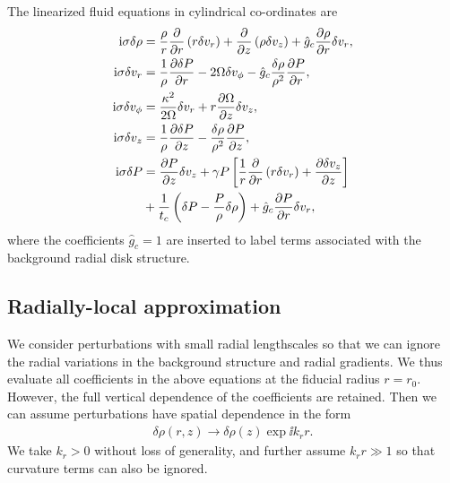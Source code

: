 The linearized fluid equations in cylindrical co-ordinates are  
\begin{align}
  \mathrm{i}\sigma\delta\rho &= \frac{\rho}{r}\frac{\partial}{\partial r}\left(r\delta v_r\right) + \frac{\partial}{\partial
    z}\left(\rho\delta v_z\right)  + \hat{g}_c\frac{\partial\rho}{\partial r}\delta v_r,\\
  \mathrm{i}\sigma\delta v_r &= \frac{1}{\rho}\frac{\partial\delta P}{\partial r} - 2\Omega
  \delta v_\phi - \hat{g}_c\frac{\delta\rho}{\rho^2}\frac{\partial P}{\partial r},\\ 
  \mathrm{i}\sigma\delta v_\phi  &= \frac{\kappa^2}{2\Omega}\delta v_r +
  r\frac{\partial\Omega}{\partial z}\delta v_z,\\
  \mathrm{i} \sigma\delta v_z &= \frac{1}{\rho}\frac{\partial\delta P}{\partial z} -
  \frac{\delta \rho}{\rho^2}\frac{\partial P}{\partial z},\\
  \mathrm{i}\sigma\delta P &=\frac{\partial P}{\partial z}\delta v_z + \gamma P
  \left[\frac{1}{r}\frac{\partial}{\partial r}\left(r\delta v_r\right) + \frac{\partial
      \delta v_z}{\partial z}\right]\notag \\
  &+ \frac{1}{t_c}\left(\delta P -  
    \frac{P}{\rho}\delta\rho\right) + \hat{g}_c \frac{\partial P}{\partial r}\delta v_r,\label{full_energy1}
\end{align}
where the coefficients $\hat{g}_c=1$ are inserted to label terms
associated with the background radial disk structure. 

\subsection{Radially-local approximation}  
We consider perturbations with small radial lengthscales 
so that we can ignore the radial variations in the background
structure and radial gradients. We thus evaluate all coefficients in
the above equations at the fiducial radius $r=r_0$. However, the full
vertical dependence of the coefficients are retained. Then we can
assume perturbations have spatial dependence in the form
\begin{align}
  \delta \rho(r,z) \to \delta\rho(z)\exp{\ii k_r r}.
\end{align}
We take $k_r>0$ without loss of generality, and further assume $k_rr\gg1$ so that curvature terms can also be 
ignored.       

